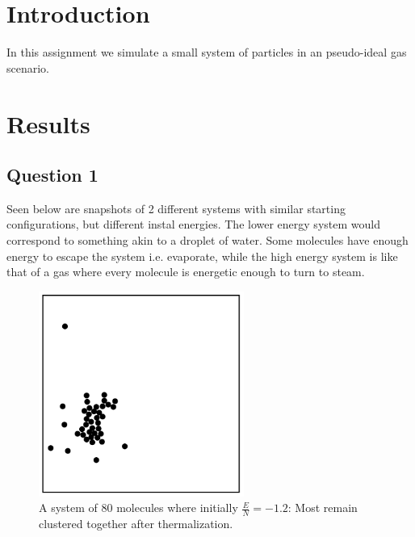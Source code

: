 \documentclass{article}
\author{\hwauthor}
\title{\hwtitle}
\date{\hwdate}
\begin{document}
\maketitle
\thispagestyle{fancy}

\section{Introduction}

In this assignment we simulate a small system of particles in an pseudo-ideal gas scenario.

\section{Results}

\subsection{Question 1}

Seen below are snapshots of 2 different systems with similar starting configurations, but different instal energies.
The lower energy system would correspond to something akin to a droplet of water. Some molecules have enough energy to escape the system i.e. evaporate, while the high energy system is like that of a gas where every molecule is energetic enough to turn to steam.

\begin{figure}[!htb]
	\begin{center}
		\includegraphics[width=0.6\textwidth]{p1_cold.pdf}
	\end{center}
	\caption{A system of 80 molecules where initially $\frac{E}{N} = -1.2$: Most remain clustered together after thermalization.}
\label{fig:qual}
\end{figure}
\FloatBarrier
\end{document}

